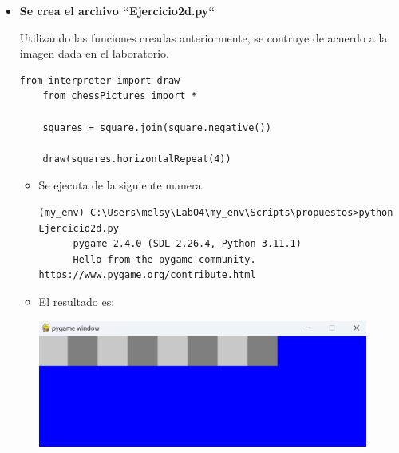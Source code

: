 \documentclass{article}
\begin{document}
\begin{itemize}
  \pagebreak

  \item \textbf{Se crea el archivo ``Ejercicio2d.py``}
  
  \vspace{\baselineskip}

  Utilizando las funciones creadas anteriormente, se contruye de acuerdo a la imagen dada en el laboratorio.

    \begin{lstlisting}[style=python]
    from interpreter import draw
    from chessPictures import *

    squares = square.join(square.negative())

    draw(squares.horizontalRepeat(4))
    \end{lstlisting}

    \vspace{\baselineskip}

    \begin{itemize}
      \item Se ejecuta de la siguiente manera.

      \begin{lstlisting}[style=shell]
      (my_env) C:\Users\melsy\Lab04\my_env\Scripts\propuestos>python Ejercicio2d.py
      pygame 2.4.0 (SDL 2.26.4, Python 3.11.1)
      Hello from the pygame community. https://www.pygame.org/contribute.html
      \end{lstlisting}

      \vspace{2\baselineskip}

      \item El resultado es:
      
      \vspace{\baselineskip}

      \begin{minipage}{\linewidth}
        \centering
        \includegraphics[width=0.9\textwidth]{imagenes/p_ej2d.png}
      \end{minipage}
    \end{itemize}


\end{itemize}
\end{document}
